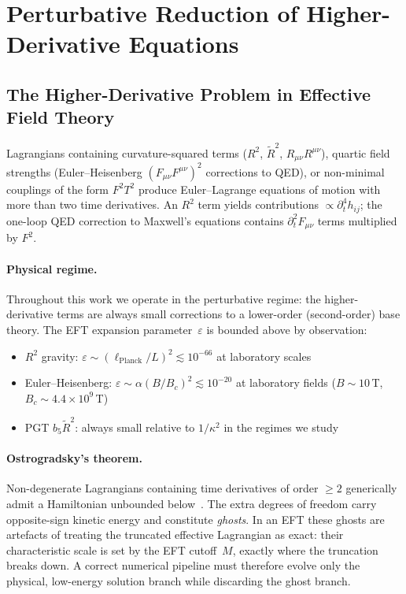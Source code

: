 
\section{Perturbative Reduction of Higher-Derivative Equations}
\label{sec:perturbative-reduction}

\subsection{The Higher-Derivative Problem in Effective Field Theory}
\label{sec:pr-problem}

Lagrangians containing curvature-squared terms ($R^2$, $\tilde{R}^2$, $R_{\mu\nu}R^{\mu\nu}$), quartic field strengths (Euler--Heisenberg $(F_{\mu\nu}F^{\mu\nu})^2$ corrections to QED), or non-minimal couplings of the form $F^2 T^2$ produce Euler--Lagrange equations of motion with more than two time derivatives. An $R^2$ term yields contributions $\propto \partial_t^4 h_{ij}$; the one-loop QED correction to Maxwell's equations contains $\partial_t^2 F_{\mu\nu}$ terms multiplied by $F^2$.

\paragraph{Physical regime.} Throughout this work we operate in the perturbative regime: the higher-derivative terms are always small corrections to a lower-order (second-order) base theory. The EFT expansion parameter~$\varepsilon$ is bounded above by observation:
\begin{itemize}
  \item $R^2$ gravity: $\varepsilon \sim (\ell_{\mathrm{Planck}}/L)^2 \lesssim 10^{-66}$ at laboratory scales
  \item Euler--Heisenberg: $\varepsilon \sim \alpha (B/B_c)^2 \lesssim 10^{-20}$ at laboratory fields ($B \sim 10$\,T, $B_c \sim 4.4 \times 10^9$\,T)
  \item PGT $b_5 \tilde{R}^2$: always small relative to $1/\kappa^2$ in the regimes we study
\end{itemize}

\paragraph{Ostrogradsky's theorem.} Non-degenerate Lagrangians containing time derivatives of order $\geq 2$ generically admit a Hamiltonian unbounded below~\cite{Ostrogradsky1850,Woodard2015}. The extra degrees of freedom carry opposite-sign kinetic energy and constitute \emph{ghosts}. In an EFT these ghosts are artefacts of treating the truncated effective Lagrangian as exact: their characteristic scale is set by the EFT cutoff~$M$, exactly where the truncation breaks down. A correct numerical pipeline must therefore evolve only the physical, low-energy solution branch while discarding the ghost branch.

